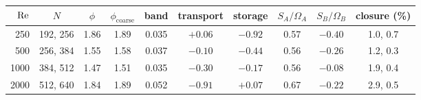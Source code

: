 \begin{tabular}{rccccccccc}
$\mathrm{Re}$ & $N$ & $\phi$ & $\phi_{\mathrm{coarse}}$ & band & transport & storage & $S_A/\Omega_A$ & $S_B/\Omega_B$ & closure (\%) \\
\hline
250 & 192, 256 & 1.86 & 1.89 & 0.035 & $+0.06$ & $-0.92$ & 0.57 & $-0.40$ & 1.0, 0.7 \\
500 & 256, 384 & 1.55 & 1.58 & 0.037 & $-0.10$ & $-0.44$ & 0.56 & $-0.26$ & 1.2, 0.3 \\
1000 & 384, 512 & 1.47 & 1.51 & 0.035 & $-0.30$ & $-0.17$ & 0.56 & $-0.08$ & 1.9, 0.4 \\
2000 & 512, 640 & 1.84 & 1.89 & 0.052 & $-0.91$ & $+0.07$ & 0.67 & $-0.22$ & 2.9, 0.5 \\
\end{tabular}
